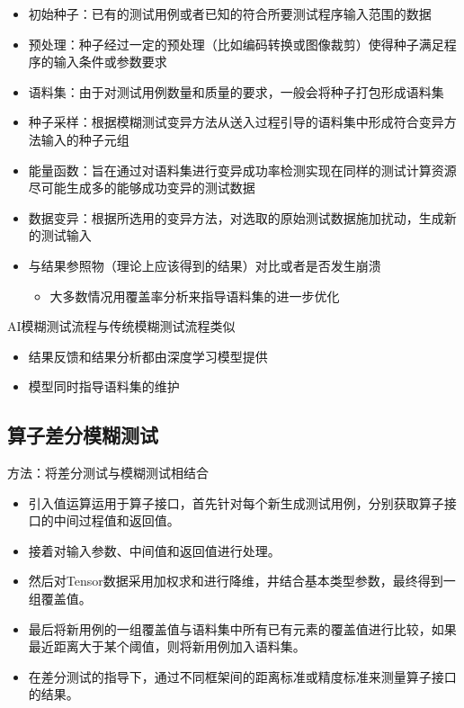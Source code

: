 \begin{itemize}
    \item 初始种子：已有的测试用例或者已知的符合所要测试程序输入范围的数据 
    \item 预处理：种子经过一定的预处理（比如编码转换或图像裁剪）使得种子满足程序的输入条件或参数要求
    \item 语料集：由于对测试用例数量和质量的要求，一般会将种子打包形成语料集
    \item 种子采样：根据模糊测试变异方法从送入过程引导的语料集中形成符合变异方法输入的种子元组
    \item 能量函数：旨在通过对语料集进行变异成功率检测实现在同样的测试计算资源尽可能生成多的能够成功变异的测试数据 
    \item 数据变异：根据所选用的变异方法，对选取的原始测试数据施加扰动，生成新的测试输入
    \item 与结果参照物（理论上应该得到的结果）对比或者是否发生崩溃
    \begin{itemize}
        \item 大多数情况用覆盖率分析来指导语料集的进一步优化
    \end{itemize}
\end{itemize}

AI模糊测试流程与传统模糊测试流程类似
\begin{itemize}
    \item 结果反馈和结果分析都由深度学习模型提供
    \item 模型同时指导语料集的维护
\end{itemize}

\subsection{算子差分模糊测试}
方法：将差分测试与模糊测试相结合
\begin{itemize}
    \item 引入值运算运用于算子接口，首先针对每个新生成测试用例，分别获取算子接口的中间过程值和返回值。
    \item 接着对输入参数、中间值和返回值进行处理。
    \item 然后对Tensor数据采用加权求和进行降维，井结合基本类型参数，最终得到一组覆盖值。
    \item 最后将新用例的一组覆盖值与语料集中所有已有元素的覆盖值进行比较，如果最近距离大于某个阈值，则将新用例加入语料集。
    \item 在差分测试的指导下，通过不同框架间的距离标准或精度标准来测量算子接口的结果。
\end{itemize}
